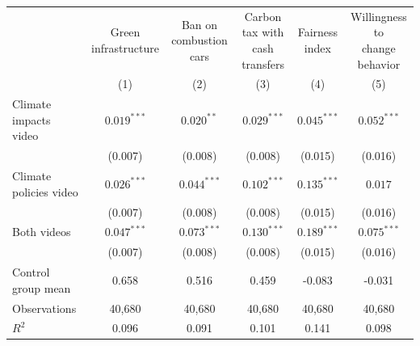 \begin{tabular}{lccccc}
\toprule
 & \shortstack{Green\\infrastructure} & \shortstack{Ban on\\combustion cars} & \shortstack{Carbon tax with\\cash transfers} & \shortstack{Fairness\\index} & \shortstack{Willingness to\\change behavior} \\
 & (1) & (2) & (3) & (4) & (5) \\
\midrule
Climate impacts video & $0.019^{***}$ & $0.020^{**}$ & $0.029^{***}$ & $0.045^{***}$ & $0.052^{***}$ \\
 & (0.007) & (0.008) & (0.008) & (0.015) & (0.016) \\
Climate policies video & $0.026^{***}$ & $0.044^{***}$ & $0.102^{***}$ & $0.135^{***}$ & $0.017$ \\
 & (0.007) & (0.008) & (0.008) & (0.015) & (0.016) \\
Both videos & $0.047^{***}$ & $0.073^{***}$ & $0.130^{***}$ & $0.189^{***}$ & $0.075^{***}$ \\
 & (0.007) & (0.008) & (0.008) & (0.015) & (0.016) \\
\addlinespace
Control group mean & 0.658 & 0.516 & 0.459 & -0.083 & -0.031 \\
Observations & 40,680 & 40,680 & 40,680 & 40,680 & 40,680 \\
$R^2$ & 0.096 & 0.091 & 0.101 & 0.141 & 0.098 \\
\bottomrule
\end{tabular}
